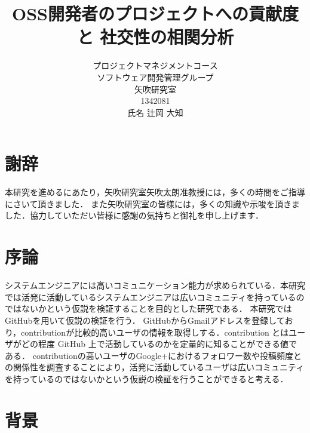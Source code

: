 \title{OSS開発者のプロジェクトへの貢献度と
社交性の相関分析}
\author{プロジェクトマネジメントコース\\
ソフトウェア開発管理グループ\\
矢吹研究室\\
1342081\\
氏名 辻岡 大知}
\date{}

\maketitle




\chapter*{謝辞}

本研究を進めるにあたり，矢吹研究室矢吹太朗准教授には，多くの時間をご指導にさいて頂きました．
また矢吹研究室の皆様には，多くの知識や示唆を頂きました．協力していただい皆様に感謝の気持ちと御礼を申し上げます．



\tableofcontents%



\chapter{序論}
システムエンジニアには高いコミュニケーション能力が求められている．本研究では活発に活動しているシステムエンジニアは広いコミュニティを持っているのではないかという仮説を検証することを目的とした研究である．
本研究ではGitHubを用いて仮説の検証を行う．
GitHubからGmailアドレスを登録しており，contributionが比較的高いユーザの情報を取得しする．contribution とはユーザがどの程度 GitHub 上で活動しているのかを定量的に知ることができる値で ある．
contributionの高いユーザのGoogle+におけるフォロワー数や投稿頻度との関係性を調査することにより，活発に活動しているユーザは広いコミュニティを持っているのではないかという仮説の検証を行うことができると考える．


\chapter{背景}

